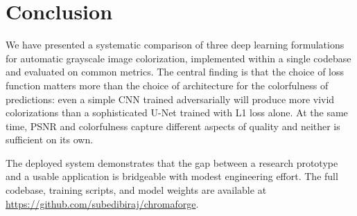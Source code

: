 \documentclass[11pt,a4paper]{article}
\begin{document}
\section{Conclusion}

We have presented a systematic comparison of three deep learning formulations
for automatic grayscale image colorization, implemented within a single codebase
and evaluated on common metrics. The central finding is that the choice of loss
function matters more than the choice of architecture for the colorfulness of
predictions: even a simple CNN trained adversarially will produce more vivid
colorizations than a sophisticated U-Net trained with L1 loss alone. At the same
time, PSNR and colorfulness capture different aspects of quality and neither is
sufficient on its own.

The deployed system demonstrates that the gap between a research prototype and a
usable application is bridgeable with modest engineering effort. The full
codebase, training scripts, and model weights are available at
\url{https://github.com/subedibiraj/chromaforge}.
\end{document}
